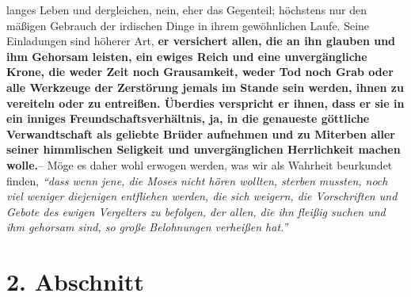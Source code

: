 langes Leben und dergleichen, nein, eher das Gegenteil; höchstens nur den
mäßigen Gebrauch der irdischen Dinge in ihrem gewöhnlichen Laufe. Seine
Einladungen sind höherer Art,
\label{ref:16_01_warum_2}
\textbf{er versichert allen, die an ihn glauben und ihm
Gehorsam leisten, ein ewiges Reich und eine unvergängliche
Krone, die weder
Zeit noch Grausamkeit, weder Tod noch Grab oder alle Werkzeuge der Zerstörung
jemals im Stande sein werden, ihnen zu vereiteln oder zu entreißen. Überdies
verspricht er ihnen, dass er sie in ein inniges Freundschaftsverhältnis, ja, in
die genaueste göttliche Verwandtschaft als geliebte Brüder aufnehmen und zu
Miterben aller seiner himmlischen Seligkeit und unvergänglichen
Herrlichkeit
machen wolle.}-- Möge es daher wohl erwogen werden, was wir als Wahrheit
beurkundet finden,
\textit{"`dass wenn jene, die Moses nicht hören wollten, sterben
mussten, noch viel weniger diejenigen entfliehen werden, die sich weigern, die
Vorschriften und Gebote des ewigen Vergelters zu befolgen, der allen, die ihn
fleißig suchen und ihm gehorsam sind, so große Belohnungen verheißen
hat."'}

\section{2. Abschnitt} \label{kap16_ab2}

